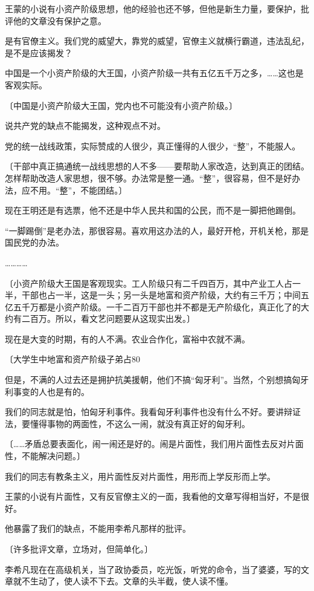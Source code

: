 王蒙的小说有小资产阶级思想，他的经验也还不够，但他是新生力量，要保护，批评他的文章没有保护之意。

是有官僚主义。我们党的威望大，靠党的威望，官僚主义就横行霸道，违法乱纪，是不是应该揭发？

中国是一个小资产阶级的大王国，小资产阶级一共有五亿五千万之多，……这也是客观实际。

〔中国是小资产阶级大王国，党内也不可能没有小资产阶级。〕

说共产党的缺点不能揭发，这种观点不对。

党的统一战线政策，实际赞成的人很少，真正懂得的人很少，“整”，不能服人。

〔干部中真正搞通统一战线思想的人不多——要帮助人家改造，达到真正的团结。怎样帮助改造人家思想，很不够。办法常是整一通。“整”，很容易，但不是好办法，应不用。“整”，不能团结。〕

现在王明还是有选票，他不还是中华人民共和国的公民，而不是一脚把他踢倒。

“一脚踢倒”是老办法，那很容易。喜欢用这办法的人，最好开枪，开机关枪，那是国民党的办法。

…………

〔小资产阶级大王国是客观现实。工人阶级只有二千四百万，其中产业工人占一半，干部也占一半，这是一头；另一头是地富和资产阶级，大约有三千万；中间五亿五千万都是小资产阶级。一千二百万干部也并不都是无产阶级化，真正化了的大约有二百万。所以，看文艺问题要从这现实出发。〕

现在是大变的时期，有的人不满。农业合作化，富裕中农就不满。

〔大学生中地富和资产阶级子弟占80%

但是，不满的人过去还是拥护抗美援朝，他们不搞“匈牙利”。当然，个别想搞匈牙利事变的人也是有的。

我们的同志就是怕，怕匈牙利事件。我看匈牙利事件也没有什么不好。要讲辩证法，要懂得事物的两面性，不这么一闹，就没有真正好的匈牙利。

〔……矛盾总要表面化，闹一闹还是好的。闹是片面性，我们用片面性去反对片面性，不能解决问题。〕

我们的同志有教条主义，用片面性反对片面性，用形而上学反形而上学。

王蒙的小说有片面性，又有反官僚主义的一面，我看他的文章写得相当好，不是很好。

他暴露了我们的缺点，不能用李希凡那样的批评。

〔许多批评文章，立场对，但简单化。〕

李希凡现在在高级机关，当了政协委员，吃光饭，听党的命令，当了婆婆，写的文章就不生动了，使人读不下去。文章的头半截，使人读不懂。

